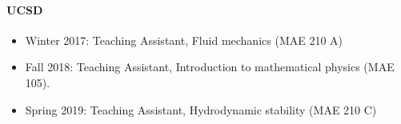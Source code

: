 \documentclass[10pt]{res} %
\begin{document}
\begin{resume}
\vspace*{-2mm}
\paragraph{UCSD} 
\begin{itemize}
	\vspace*{2mm}
	\item Winter 2017: Teaching Assistant, Fluid mechanics (MAE 210 A)
	\item Fall   2018: Teaching Assistant, Introduction to mathematical physics (MAE 105).
	\item Spring 2019: Teaching Assistant, Hydrodynamic stability (MAE 210 C)
\end{itemize}
%
%
%		
%		

\end{resume}
\end{document}
